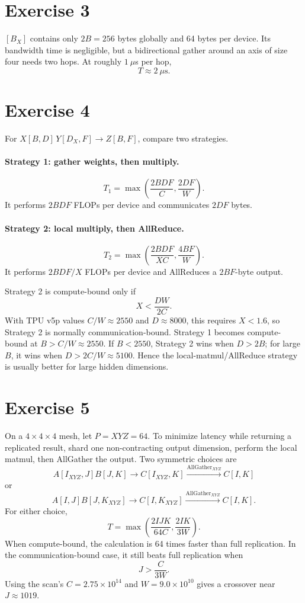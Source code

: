 \documentclass[11pt]{article}
\newcommand{\AG}{\operatorname{AllGather}}
\begin{document}
\section*{Exercise 3}

$[B_X]$ contains only $2B=256$ bytes globally and 64 bytes per device. Its
bandwidth time is negligible, but a bidirectional gather around an axis of size
four needs two hops. At roughly $1\ \mu$s per hop,
\[
\boxed{T\approx2\ \mu\mathrm{s}}.
\]

\section*{Exercise 4}

For $X[B,D]\,Y[D_X,F]\to Z[B,F]$, compare two strategies.

\paragraph{Strategy 1: gather weights, then multiply.}
\[
T_1=\max\left(\frac{2BDF}{C},\frac{2DF}{W}\right).
\]
It performs $2BDF$ FLOPs per device and communicates $2DF$ bytes.

\paragraph{Strategy 2: local multiply, then AllReduce.}
\[
T_2=\max\left(\frac{2BDF}{XC},\frac{4BF}{W}\right).
\]
It performs $2BDF/X$ FLOPs per device and AllReduces a $2BF$-byte output.

Strategy 2 is compute-bound only if
\[
X<\frac{DW}{2C}.
\]
With TPU v5p values $C/W\approx2550$ and $D\approx8000$, this requires
$X<1.6$, so Strategy 2 is normally communication-bound. Strategy 1 becomes
compute-bound at $B>C/W\approx2550$. If $B<2550$, Strategy 2 wins when
$D>2B$; for large $B$, it wins when $D>2C/W\approx5100$. Hence the
local-matmul/AllReduce strategy is usually better for large hidden dimensions.

\section*{Exercise 5}

On a $4\times4\times4$ mesh, let $P=XYZ=64$. To minimize latency while
returning a replicated result, shard one non-contracting output dimension,
perform the local matmul, then AllGather the output. Two symmetric choices are
\[
A[I_{XYZ},J]B[J,K]\to C[I_{XYZ},K]\xrightarrow{\AG_{XYZ}}C[I,K]
\]
or
\[
A[I,J]B[J,K_{XYZ}]\to C[I,K_{XYZ}]\xrightarrow{\AG_{XYZ}}C[I,K].
\]
For either choice,
\[
T=\max\left(\frac{2IJK}{64C},\frac{2IK}{3W}\right).
\]
When compute-bound, the calculation is 64 times faster than full replication.
In the communication-bound case, it still beats full replication when
\[
J>\frac{C}{3W}.
\]
Using the scan's $C=2.75\times10^{14}$ and $W=9.0\times10^{10}$ gives a
crossover near $J\approx1019$.
\end{document}
